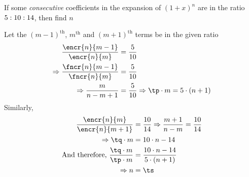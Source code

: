 



\gcalcexpr[0]\tp{\vbone + \vbtwo}
\gcalcexpr[0]\tq{\vbtwo + \vbthree}
\gcalcexpr[2]\tr{\tq / \tp}
\gcalcexpr[0]\ts{(\tr * \vbone + \vbthree) / (\vbtwo - \tr * \vbone)}

\question[4] If some \textit{consecutive} coefficients in the expansion of $(1+x)^n$ are in the 
ratio $5:10:14$, then find $n$


\watchout

\ifprintanswers
\fi 

\begin{solution}[\halfpage]
	Let the $(m-1)^{\text{th}}$, $m^{\text{th}}$ and $(m+1)^{\text{th}}$ terms be in the given ratio
	\begin{align}
		\dfrac{\encr{n}{m-1}}{\encr{n}{m}} &= \dfrac{\vbone}{\vbtwo} \\
		\Rightarrow \dfrac{\fncr{n}{m-1}}{\fncr{n}{m}} &= \dfrac{\vbone}{\vbtwo} \\
		\Rightarrow \dfrac{m}{n-m+1} &= \dfrac{\vbone}{\vbtwo} \Rightarrow \tp\cdot m = \vbone\cdot(n+1)
	\end{align}
	Similarly,
	\begin{align}
		\dfrac{\encr{n}{m}}{\encr{n}{m+1}} &= \dfrac{\vbtwo}{\vbthree} \Rightarrow \dfrac{m+1}{n-m} = \dfrac{\vbtwo}{\vbthree} \\
		\Rightarrow \tq\cdot m &= \vbtwo\cdot n - \vbthree \\
		\text{And therefore, } \dfrac{\tq\cdot m}{\tp\cdot m} &= \dfrac{\vbtwo\cdot n - \vbthree}{\vbone\cdot(n+1)} \\
		\Rightarrow n &= \ts
	\end{align}
\end{solution}

